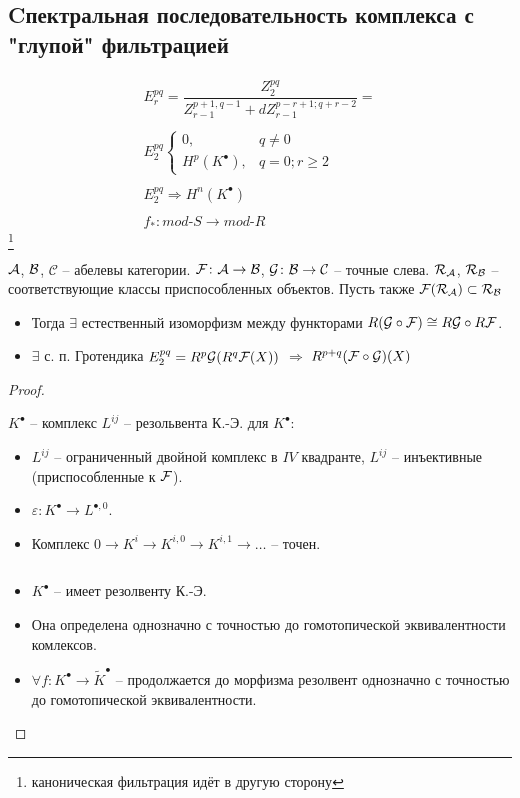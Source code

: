 \documentclass[../main.tex]{subfiles}
\begin{document}
\subsection{Cпектральная последовательность комплекса с "глупой" фильтрацией}
\begin{align*}
E_r^{pq} = \dfrac{Z_2^{pq}}{Z_{r-1}^{p+1, q-1} + dZ_{r-1}^{p-r+1;q+r-2}} =
\\ \\
E_2^{pq}\begin{cases} 0, &q\neq 0 \\ H^p(K^\bullet), &q=0; r\ge 2
\end{cases}\\
\\
E_2^{pq} \Rightarrow H^n(K^\bullet)\\\\
f_{*}: mod\text{-}S \to mod\text{-}R
\end{align*}\footnote{каноническая фильтрация идёт в другую сторону}
\begin{to_thr}[Гротендик]
$\mathcal{A}$, $\mathcal{B}$, $\mathcal{C}$ -- абелевы категории. $\mathcal{F} \colon \mathcal{A} \to \mathcal{B}$, $\mathcal{G}\colon \mathcal{B} \to \mathcal{C}$ -- точные слева. $\mathcal{R}_{\mathcal{A}}$, $\mathcal{R}_{\mathcal{B}}$ -- соответствующие классы приспособленных объектов. Пусть также $\mathcal{F}(\mathcal{R}_{\mathcal{A}}) \subset \mathcal{R}_{\mathcal{B}}$
\begin{itemize}
    \item Тогда $\exists$ естественный изоморфизм между функторами $R(\mathcal{G}\circ \mathcal{F})\cong R\mathcal{G}\circ R\mathcal{F}$.
    \item $\exists$ с. п. Гротендика $E_2^{pq} = R^p \mathcal{G} (R^q\mathcal{F}(X))$ $\Rightarrow$ $R^{p+q}(\mathcal{F} \circ \mathcal{G})(X)$
\end{itemize}
\end{to_thr}
\begin{proof}
\begin{to_def}
$K^\bullet$ -- комплекс $L^{ij}$ -- резольвента К.-Э. для $K^\bullet$:
\begin{itemize}
    \item $L^{ij}$ -- ограниченный двойной комплекс в $IV$ квадранте, $L^{ij}$ -- инъективные (приспособленные к $\mathcal{F}$).
    \item $\varepsilon\colon K^\bullet \to L^{\bullet, 0}$.
    \item Комплекс $0 \to K^i \to K^{i, 0} \to K^{i, 1}\to \ldots$ -- точен.
\end{itemize}
\end{to_def}
\begin{to_thr}
$ $\\
\begin{itemize}
    \item $K^\bullet$ -- имеет резолвенту К.-Э.
    \item Она определена однозначно с точностью до гомотопической эквивалентности комлексов.
    \item $\forall f\colon K^\bullet \to \tilde{K}^\bullet$ -- продолжается до морфизма резолвент однозначно с точностью до гомотопической эквивалентности. 
\end{itemize}
\end{to_thr}
\end{proof}
\end{document}
